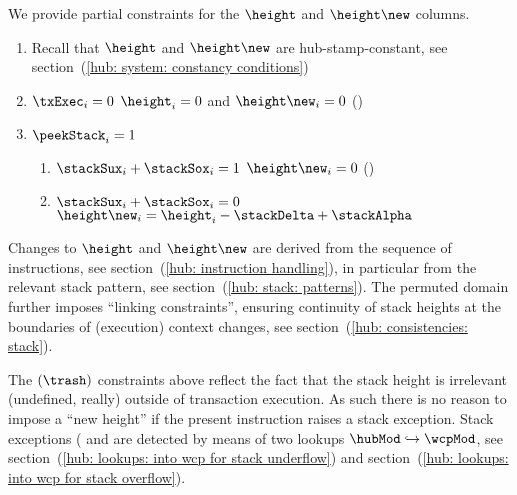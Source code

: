 We provide partial constraints for the $\height$ and $\height\new$ columns.
\begin{enumerate}
	\item Recall that $\height$ and $\height\new$ are hub-stamp-constant, see section~(\ref{hub: system: constancy conditions})
	\item \If $\txExec_{i} = 0$ \Then $\height_{i} = 0$ and $\height\new _{i} = 0$ \quad (\trash)
	\item \If $\peekStack _{i} = 1$ \Then
		\begin{enumerate}
			\item \If $\stackSux _{i} + \stackSox _{i} = 1$ \Then $\height\new _{i} = 0$ \quad (\trash)
		        \item \If $\stackSux _{i} + \stackSox _{i} = 0$ \Then $\height\new _{i} = \height_{i} - \stackDelta + \stackAlpha$
		\end{enumerate}
\end{enumerate}
Changes to $\height$ and $\height\new$ are derived from the sequence of instructions, see
section~(\ref{hub: instruction handling}),
in particular from the relevant stack pattern, see
section~(\ref{hub: stack: patterns}).
The permuted domain further imposes ``linking constraints'', ensuring continuity of stack heights at the boundaries of (execution) context changes, see section~(\ref{hub: consistencies: stack}).

\saNote{}
The $(\trash)$ constraints above reflect the fact that the stack height is irrelevant (undefined, really) outside of transaction execution.
As such there is no reason to impose a ``new height'' if the present instruction raises a stack exception.
Stack exceptions (\suxSH{} and \soxSH{} are detected by means of two lookups $\hubMod\hookrightarrow\wcpMod$, see
section~(\ref{hub: lookups: into wcp for stack underflow}) and
section~(\ref{hub: lookups: into wcp for stack overflow}).
